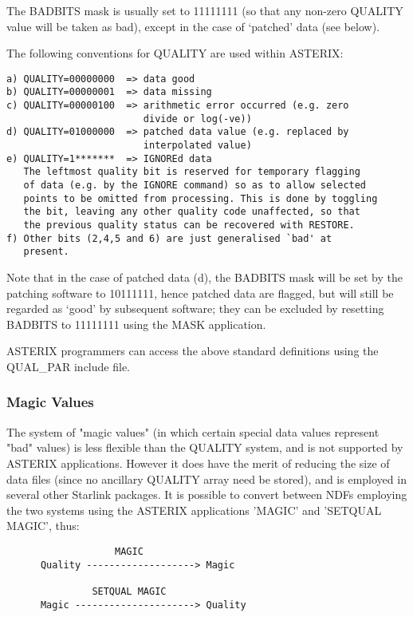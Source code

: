 The BADBITS mask is usually set to  11111111  (so  that  any  non-zero
QUALITY  value  will be taken as bad), except in the case of `patched'
data (see below).

The following conventions for QUALITY are used within ASTERIX:

\begin{verbatim}
a) QUALITY=00000000  => data good
b) QUALITY=00000001  => data missing
c) QUALITY=00000100  => arithmetic error occurred (e.g. zero 
                        divide or log(-ve))
d) QUALITY=01000000  => patched data value (e.g. replaced by
                        interpolated value)
e) QUALITY=1*******  => IGNOREd data
   The leftmost quality bit is reserved for temporary flagging 
   of data (e.g. by the IGNORE command) so as to allow selected 
   points to be omitted from processing. This is done by toggling 
   the bit, leaving any other quality code unaffected, so that 
   the previous quality status can be recovered with RESTORE.
f) Other bits (2,4,5 and 6) are just generalised `bad' at 
   present.
\end{verbatim}

Note that in the case of patched data (d), the BADBITS  mask  will  be
set  by  the  patching  software  to  10111111, hence patched data are
flagged, but will still be regarded as `good' by subsequent  software;
they  can  be excluded by resetting BADBITS to 11111111 using the MASK
application.

ASTERIX programmers can access the above  standard  definitions  using
the QUAL\_PAR include file.

\subsubsection{Magic Values}

The system of "magic values" (in  which  certain
special  data values represent "bad" values) is less flexible than the
QUALITY system, and is not supported by ASTERIX applications.  However
it  does  have  the merit of reducing the size of data files (since no
ancillary QUALITY array need be stored), and is  employed  in  several
other  Starlink  packages.   It  is  possible  to convert between NDFs
employing the two systems using the ASTERIX applications  'MAGIC'  and
'SETQUAL MAGIC', thus:

\begin{verbatim}
                   MAGIC
      Quality -------------------> Magic

               SETQUAL MAGIC
      Magic ---------------------> Quality
\end{verbatim}

